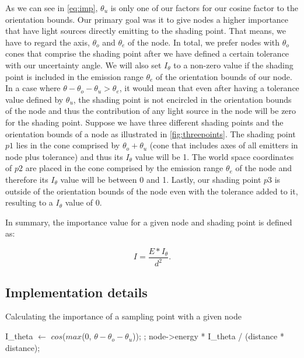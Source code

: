 As we can see in \ref{eq:imp}, $\theta_u$ is only one of our factors for our cosine factor to the orientation bounds. Our primary goal was it to give nodes a higher importance that have light sources directly emitting to the shading point. That means, we have to regard the axis, $\theta_o$ and $\theta_e$ of the node. In total, we prefer nodes with $\theta_o$ cones that comprise the shading point after we have defined a certain tolerance with our uncertainty angle. We will also set $I_\theta$ to a non-zero value if the shading point is included in the emission range $\theta_e$ of the orientation bounds of our node. In a case where $\theta - \theta_o - \theta_u > \theta_e$, it would mean that even after having a tolerance value defined by $\theta_u$, the shading point is not encircled in the orientation bounds of the node and thus the contribution of any light source in the node will be zero for the shading point. Suppose we have three different shading points and the orientation bounds of a node as illustrated in \ref{fig:threepoints}. The shading point $p1$ lies in the cone comprised by $\theta_o + \theta_u$ (cone that includes axes of all emitters in node plus tolerance) and thus its $I_\theta$ value will be 1. The world space coordinates of $p2$ are placed in the cone comprised by the emission range $\theta_e$ of the node and therefore its $I_\theta$ value will be between 0 and 1. Lastly, our shading point $p3$ is outside of the orientation bounds of the node even with the tolerance added to it, resulting to a $I_\theta$ value of 0.

In summary, the importance value for a given node and shading point is defined as:

\begin{equation}
\label{eq:imp2}
I = \frac{E * I_\theta}{d ^ 2}.
\end{equation}

\subsection{Implementation details}

\begin{algorithm}
	\caption{Calculating the importance of a sampling point with a given node}
	\label{alg:imp}
	\begin{algorithmic}[1] %
		\State I\_theta $\gets$ $cos$($max$(0, $\theta - \theta_o - \theta_u$));
		\Else
		\State {};
		\EndIf
		\State \Return node->energy * I\_theta / (distance * distance);
		\EndProcedure
	\end{algorithmic}
\end{algorithm}

